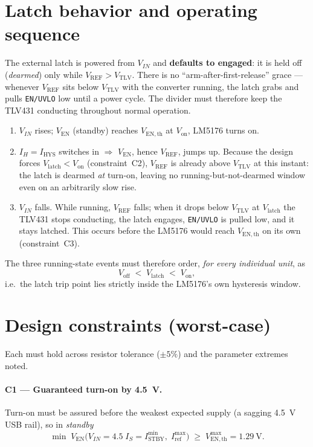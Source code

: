 \documentclass[11pt]{article}
\newcommand{\Ven}{V_{\mathrm{EN}}}
\newcommand{\Vref}{V_{\mathrm{REF}}}
\newcommand{\Vtlv}{V_{\mathrm{TLV}}}
\newcommand{\Vth}{V_{\mathrm{EN,th}}}
\newcommand{\Iref}{I_{\mathrm{ref}}}
\newcommand{\Istby}{I_{\mathrm{STBY}}}
\newcommand{\Ihys}{I_{\mathrm{HYS}}}
\newcommand{\IH}{I_{H}}
\begin{document}
\section{Latch behavior and operating sequence}

The external latch is powered from $V_{IN}$ and \textbf{defaults to engaged}: it is
held off (\emph{dearmed}) only while $\Vref>\Vtlv$. There is no
``arm-after-first-release'' grace --- whenever $\Vref$ sits below $\Vtlv$ with the
converter running, the latch grabs and pulls \texttt{EN/UVLO} low until a power cycle.
The divider must therefore keep the TLV431 conducting throughout normal operation.

\begin{enumerate}[nosep]
\item $V_{IN}$ rises; $\Ven$ (standby) reaches $\Vth$ at $V_{\mathrm{on}}$, LM5176 turns on.
\item $\IH=\Ihys$ switches in $\Rightarrow$ $\Ven$, hence $\Vref$, jumps up. Because the
design forces $V_{\mathrm{latch}}<V_{\mathrm{on}}$ (constraint~C2), $\Vref$ is already
above $\Vtlv$ at this instant: the latch is dearmed \emph{at} turn-on, leaving no
running-but-not-dearmed window even on an arbitrarily slow rise.
\item $V_{IN}$ falls. While running, $\Vref$ falls; when it drops below $\Vtlv$ at
$V_{\mathrm{latch}}$ the TLV431 stops conducting, the latch engages, \texttt{EN/UVLO} is
pulled low, and it stays latched. This occurs before the LM5176 would reach $\Vth$ on its
own (constraint~C3).
\end{enumerate}

The three running-state events must therefore order, \emph{for every individual unit}, as
\begin{equation}
V_{\mathrm{off}}\;<\;V_{\mathrm{latch}}\;<\;V_{\mathrm{on}},
\label{eq:order}
\end{equation}
i.e.\ the latch trip point lies strictly inside the LM5176's own hysteresis window.

\section{Design constraints (worst-case)}

Each must hold across resistor tolerance ($\pm5\%$) and the parameter extremes noted.

\paragraph{C1 --- Guaranteed turn-on by \SI{4.5}{\volt}.}
Turn-on must be assured before the weakest expected supply (a sagging
\SI{4.5}{\volt} USB rail), so in \emph{standby}
\begin{equation}
\min \;\Ven\big(V_{IN}{=}4.5\;I_S{=}\Istby^{\min},\;\Iref^{\max}\big)\;\ge\;\Vth^{\max}=\SI{1.29}{\volt}.
\end{equation}
\end{document}
